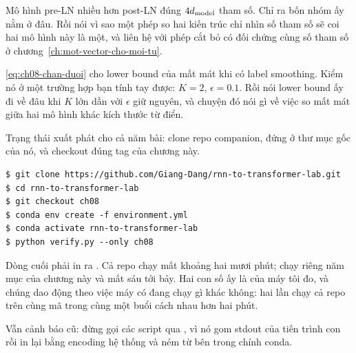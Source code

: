 \begin{bt}
  \item Mô hình pre-LN nhiều hơn post-LN đúng \(4d_{\mathrm{model}}\) tham số. Chỉ ra bốn
    nhóm ấy nằm ở đâu. Rồi nói vì sao một phép so hai kiến trúc chỉ nhìn số tham
    số sẽ coi hai mô hình này là một, và liên hệ với phép cắt bỏ có đối chứng
    cùng số tham số ở chương~\ref{ch:mot-vector-cho-moi-tu}.

  \item \eqref{eq:ch08-chan-duoi} cho lower bound của mất mát khi có label
    smoothing. Kiểm nó ở một trường hợp bạn tính tay được: \(K = 2\),
    \(\epsilon = 0.1\). Rồi nói lower bound ấy đi về đâu khi \(K\) lớn dần với
    \(\epsilon\) giữ nguyên, và chuyện đó
    nói gì về việc so mất mát giữa hai mô hình khác kích thước từ điển.
\end{bt}

\tierapply

Trạng thái xuất phát cho cả năm bài: clone repo companion, đứng ở thư mục gốc
của nó, và checkout đúng tag của chương này.

\begin{verbatim}
$ git clone https://github.com/Giang-Dang/rnn-to-transformer-lab.git
$ cd rnn-to-transformer-lab
$ git checkout ch08
$ conda env create -f environment.yml
$ conda activate rnn-to-transformer-lab
$ python verify.py --only ch08
\end{verbatim}

Dòng cuối phải in ra . Cả repo chạy mất khoảng hai mươi phút;
 chạy riêng năm mục của chương này và mất sáu tới bảy. Hai con
số ấy là của máy tôi đo, và chúng dao động theo việc máy có đang chạy gì khác
không: hai lần chạy cả repo trên cùng mã trong cùng một buổi cách nhau hơn hai
phút.

Vẫn cảnh báo cũ: đừng gọi các script qua , vì nó gom stdout của
tiến trình con rồi in lại bằng encoding hệ thống và ném
 từ bên trong chính conda.

